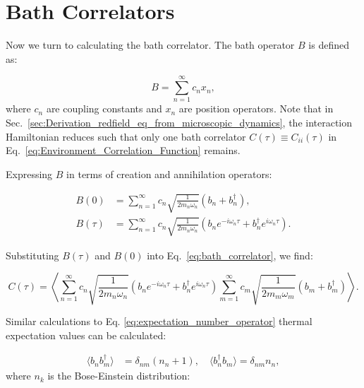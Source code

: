 \section{Bath Correlators}
\label{sec:bath_corr_trans_rates}

Now we turn to calculating the bath correlator.
The bath operator \( B \) is defined as:

\begin{equation} \label{eq:bath_operator}
	B = \sum_{n=1}^{\infty} c_n x_n,
\end{equation}
where \( c_n \) are coupling constants and \( x_n \) are position operators. Note that in Sec.~\ref{sec:Derivation_redfield_eq_from_microscopic_dynamics}, the interaction Hamiltonian reduces such that only one bath correlator \( C(\tau) \equiv C_{ii}(\tau) \) in Eq.~\eqref{eq:Environment_Correlation_Function} remains.

Expressing \( B \) in terms of creation and annihilation operators:

\begin{align}
	B(0)    & = \sum_{n=1}^{\infty} c_n \sqrt{\frac{1}{2 m_n \omega_n}} (b_n + b_n^\dagger), \label{eq:bath_operator_t0}                                                        \\
	B(\tau) & = \sum_{n=1}^{\infty} c_n \sqrt{\frac{1}{2 m_n \omega_n}} \left( b_n e^{-i \omega_n \tau} + b_n^\dagger e^{i \omega_n \tau} \right). \label{eq:bath_operator_tau}
\end{align}

Substituting \( B(\tau) \) and \( B(0) \) into Eq.~\eqref{eq:bath_correlator}, we find:

\begin{equation} \label{eq:correlator_substitution}
	C(\tau) = \left\langle \sum_{n=1}^{\infty} c_n \sqrt{\frac{1}{2 m_n \omega_n}} (b_n e^{-i \omega_n \tau} + b_n^\dagger e^{i \omega_n \tau}) \sum_{m=1}^{\infty} c_m \sqrt{\frac{1}{2 m_m \omega_m}} (b_m + b_m^\dagger) \right\rangle.
\end{equation}

Similar calculations to Eq. \eqref{eq:expectation_number_operator} thermal expectation values can be calculated:

\begin{align} \label{eq:thermal_expectations}
	\langle b_n b_m^\dagger \rangle & = \delta_{nm} (n_n + 1), \quad \langle b_n^\dagger b_m \rangle = \delta_{nm} n_n,
\end{align}
where \( n_k \) is the Bose-Einstein distribution:

